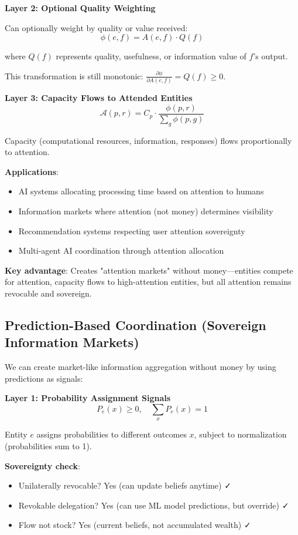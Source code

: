 \documentclass[11pt,a4paper]{article}
\theoremstyle{definition}
\theoremstyle{remark}
\newcommand{\A}{\mathcal{A}}
\begin{document}
\textbf{Layer 2: Optional Quality Weighting}

Can optionally weight by quality or value received:
\[ \phi(e,f) = A(e,f) \cdot Q(f) \]

where $Q(f)$ represents quality, usefulness, or information value of $f$'s output.

This transformation is still monotonic: $\frac{\partial \phi}{\partial A(e,f)} = Q(f) \ge 0$.

\textbf{Layer 3: Capacity Flows to Attended Entities}
\[ \A(p,r) = C_p \cdot \frac{\phi(p,r)}{\sum_g \phi(p,g)} \]

Capacity (computational resources, information, responses) flows proportionally to attention.

\textbf{Applications}:
\begin{itemize}
\item AI systems allocating processing time based on attention to humans
\item Information markets where attention (not money) determines visibility
\item Recommendation systems respecting user attention sovereignty
\item Multi-agent AI coordination through attention allocation
\end{itemize}

\textbf{Key advantage}: Creates "attention markets" without money—entities compete for attention, capacity flows to high-attention entities, but all attention remains revocable and sovereign.

\subsection{Prediction-Based Coordination (Sovereign Information Markets)}

We can create market-like information aggregation without money by using predictions as signals:

\textbf{Layer 1: Probability Assignment Signals}
\[ P_e(x) \ge 0, \quad \sum_x P_e(x) = 1 \]

Entity $e$ assigns probabilities to different outcomes $x$, subject to normalization (probabilities sum to 1).

\textbf{Sovereignty check}:
\begin{itemize}
\item Unilaterally revocable? Yes (can update beliefs anytime) ✓
\item Revokable delegation? Yes (can use ML model predictions, but override) ✓
\item Flow not stock? Yes (current beliefs, not accumulated wealth) ✓
\end{itemize}
\end{document}
